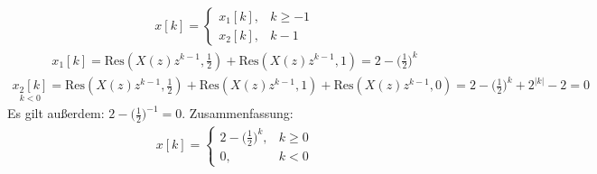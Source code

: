 \begin{align}
	x[k]=
	\begin{cases}
		x_1[k], &k\geq-1 \\
		x_2[k], &k-1
	\end{cases}
\end{align}
\begin{align}
	x_1[k]=\mathrm{Res}(X(z)z^{k-1},\frac{1}{2})+\mathrm{Res}(X(z)z^{k-1},1)=2-\bigg (\frac{1}{2}\bigg)^k
\end{align}
\begin{align}
	\underset{k<0}{x_2[k]}=\mathrm{Res}(X(z)z^{k-1},\frac{1}{2})+\mathrm{Res}(X(z)z^{k-1},1)+\mathrm{Res}(X(z)z^{k-1},0)=2-\bigg (\frac{1}{2})^k+2^{|k|}-2=0
\end{align}
Es gilt außerdem: $2-\bigg (\frac{1}{2}\bigg)^{-1}=0$.
Zusammenfassung:
\begin{align}
	x[k]=
	\begin{cases}
		2-\bigg (\frac{1}{2}\bigg)^k, &k\geq 0 \\
		0, &k< 0
	\end{cases}
\end{align}

